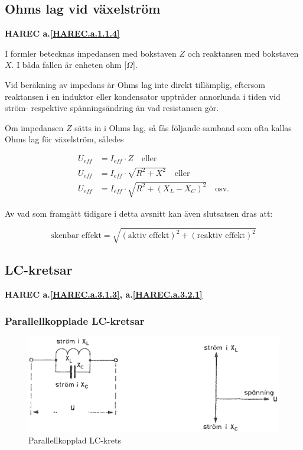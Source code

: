 \subsection{Ohms lag vid växelström}
\textbf{HAREC
  a.\ref{HAREC.a.1.1.4}\label{myHAREC.a.1.1.4b}
}

I formler betecknas impedansen med bokstaven \(Z\) och reaktansen med bokstaven
\(X\).
I båda fallen är enheten ohm [\(\Omega\)].

Vid beräkning av impedans är Ohms lag inte direkt tillämplig, eftersom
reaktansen i en induktor eller kondensator uppträder annorlunda i tiden vid
ström- respektive spänningsändring än vad resistansen gör.

Om impedansen \(Z\) sätts in i Ohms lag, så fås följande samband som ofta kallas
Ohms lag för växelström, således

\begin{align*}
  U_{eff} &= I_{eff} \cdot Z \quad \text{eller} \\
  U_{eff} &= I_{eff} \cdot \sqrt{R^2 + X^2} \quad \text{eller} \\
  U_{eff} &= I_{eff} \cdot \sqrt{R^2 + (X_L - X_C)^2} \quad \text{osv.}
\end{align*}

Av vad som framgått tidigare i detta avsnitt kan även slutsatsen dras att:

\[
\text{skenbar effekt} = \sqrt{(\text{aktiv effekt})^2 + (\text{reaktiv effekt})^2}
\]

\subsection{LC-kretsar}
\textbf{HAREC
  a.\ref{HAREC.a.3.1.3}\label{myHAREC.a.3.1.3d},
  a.\ref{HAREC.a.3.2.1}\label{myHAREC.a.3.2.1}
}

\subsubsection{Parallellkopplade LC-kretsar}

\begin{figure}
\includegraphics[width=\textwidth]{images/cropped_pdfs/bild_2_3-15.pdf}
\caption{Parallellkopplad LC-krets}
\label{fig:BildII3-15}
\end{figure}

